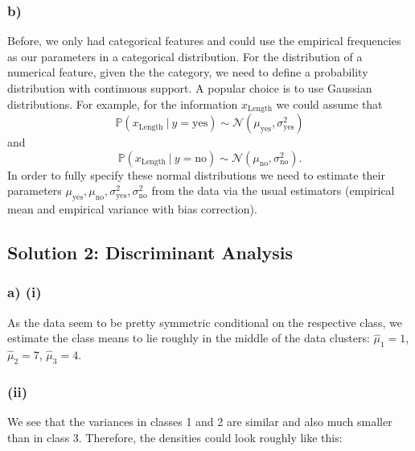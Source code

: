 \documentclass[11pt]{article}
\renewcommand{\P}{\mathds{P}} %
\newcommand{\normal}{\mathcal{N}} %
\begin{document}
\subsubsection*{b)}
Before, we only had categorical features and could use the empirical 
frequencies as our parameters in a categorical distribution.
For the distribution of a numerical feature, given the the category, we need 
to define a probability distribution with continuous support.
A popular choice is to use Gaussian distributions.
For example, for the information $x_\text{Length}$ we could assume that 
$$\P(x_\text{Length} ~|~ y = \text{yes}) \sim \normal(\mu_\text{yes}, 
\sigma^2_\text{yes})$$ and $$\P(x_\text{Length} ~|~ y = \text{no}) \sim 
\normal(\mu_\text{no}, \sigma^2_\text{no}).$$ 
In order to fully specify these normal distributions we need to estimate 
their parameters $\mu_\text{yes}, \mu_\text{no}, \sigma^2_\text{yes}, 
\sigma^2_\text{no}$ from the data via the usual estimators 
(empirical mean and empirical variance with bias correction).


    \hypertarget{solution-2-discriminant-analysis}{%
\subsection*{Solution 2: Discriminant
Analysis}\label{solution-2-discriminant-analysis}}

\subsubsection*{a) (i)}
As the data seem to be pretty symmetric conditional on the 
respective class, we estimate the class means to lie roughly in the middle 
of the data clusters: $\hat \mu_1 = 1$, $\hat \mu_2 = 7$, $\hat \mu_3 = 4$.

    \hypertarget{a-ii}{%
\subsubsection*{(ii)}\label{a-ii}}

    We see that the variances in classes 1 and 2 are similar and also much
smaller than in class 3. Therefore, the densities could look roughly
like this:
\end{document}
